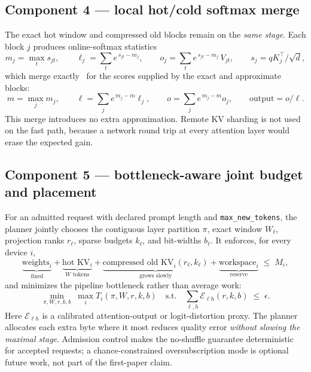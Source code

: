 \documentclass[11pt]{article}
\begin{document}
\subsection{Component 4 --- local hot/cold softmax merge}
The exact hot window and compressed old blocks remain on the \emph{same stage}. Each block
$j$ produces online-softmax statistics
\[
m_j=\max_t s_{jt},\qquad
\ell_j=\sum_t e^{\,s_{jt}-m_j},\qquad
o_j=\sum_t e^{\,s_{jt}-m_j}\,V_{jt},
\qquad s_j = qK_j^\top/\sqrt{d},
\]
which merge exactly~\cite{onlinesoftmax,flashattention} for the scores supplied by the exact
and approximate blocks:
\[
m=\max_j m_j,\qquad
\ell=\sum_j e^{\,m_j-m}\ell_j,\qquad
o=\sum_j e^{\,m_j-m}o_j,\qquad
\text{output}=o/\ell .
\]
This merge introduces no extra approximation. Remote KV sharding is not used on the fast path,
because a network round trip at every attention layer would erase the expected gain.

\subsection{Component 5 --- bottleneck-aware joint budget and placement}
For an admitted request with declared prompt length and \texttt{max\_new\_tokens}, the planner
jointly chooses the contiguous layer partition $\pi$, exact window $W_\ell$, projection ranks
$r_\ell$, sparse budgets $k_\ell$, and bit-widths $b_\ell$. It enforces, for every device $i$,
\[
\underbrace{\text{weights}_i}_{\text{fixed}} + \underbrace{\text{hot KV}_i}_{W\text{ tokens}}
+ \underbrace{\text{compressed old KV}_i(r_\ell,k_\ell)}_{\text{grows slowly}}
+ \underbrace{\text{workspace}_i}_{\text{reserve}} \;\le\; M_i ,
\]
and minimizes the pipeline bottleneck rather than average work:
\[
\min_{\pi,W,r,k,b}\;\max_i T_i(\pi,W,r,k,b)
\quad\text{s.t.}\quad \sum_{\ell,h}\mathcal E_{\ell h}(r,k,b)\;\le\;\epsilon .
\]
Here $\mathcal E_{\ell h}$ is a calibrated attention-output or logit-distortion proxy. The
planner allocates each extra byte where it most reduces quality error \emph{without slowing the
maximal stage}. Admission control makes the no-shuffle guarantee deterministic for accepted
requests; a chance-constrained oversubscription mode is optional future work, not part of the
first-paper claim.
\end{document}
